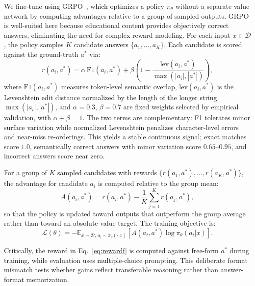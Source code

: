 \documentclass{article}
\begin{document}
We fine-tune using GRPO~\cite{shao2024deepseekmath}, which optimizes a policy 
$\pi_\theta$ without a separate value network by computing advantages relative 
to a group of sampled outputs. GRPO is well-suited here because educational 
content provides objectively correct answers, eliminating the need for complex 
reward modeling. For each input $x \in \mathcal{D}$, the policy samples $K$ candidate answers 
$\{a_1, \ldots, a_K\}$. Each candidate is scored against the ground-truth 
$a^*$ via:
\begin{equation}
    r(a_i, a^*) = \alpha\,\text{F1}(a_i, a^*) + \beta \left(1 - 
    \frac{\text{lev}(a_i, a^*)}{\max(|a_i|, |a^*|)}\right),
\label{eq:rewardf}
\end{equation}
where $\text{F1}(a_i, a^*)$ measures token-level semantic overlap, 
$\text{lev}(a_i, a^*)$ is the Levenshtein edit distance normalized by the 
length of the longer string $\max(|a_i|, |a^*|)$, and $\alpha = 0.3$, 
$\beta = 0.7$ are fixed weights selected by empirical validation, with 
$\alpha + \beta = 1$. The two terms are complementary: F1 tolerates minor 
surface variation while normalized Levenshtein penalizes character-level 
errors and near-miss re-orderings. This yields a stable continuous signal; 
exact matches score $1.0$, semantically correct answers with minor variation 
score $0.65$--$0.95$, and incorrect answers score near zero.

For a group of $K$ sampled candidates with rewards 
$\{r(a_1, a^*), \ldots, r(a_K, a^*)\}$, the advantage for candidate $a_i$ 
is computed relative to the group mean:
\begin{equation}
    A(a_i, a^*) = r(a_i, a^*) - \frac{1}{K}\sum_{j=1}^{K} r(a_j, a^*),
\end{equation}
so that the policy is updated toward outputs that outperform the group 
average rather than toward an absolute value target. The training objective 
is:
\begin{equation}
    \mathcal{L}(\theta) = -\mathbb{E}_{x \sim \mathcal{D},\, 
    a_i \sim \pi_\theta(\cdot|x)}\left[A(a_i, a^*)\log\pi_\theta(a_i|x)
    \right].
\end{equation}


Critically, the reward in Eq.~\ref{eq:rewardf} is computed against free-form
$a^*$ during training, while evaluation uses multiple-choice prompting.
This deliberate format mismatch tests whether gains reflect transferable
reasoning rather than answer-format memorization. 
\end{document}
